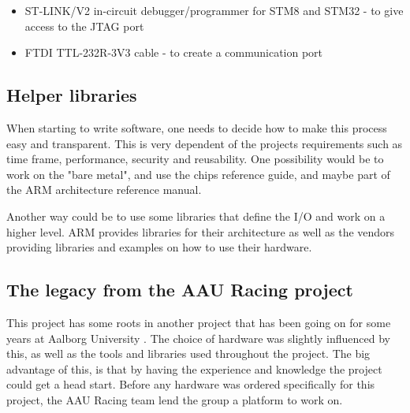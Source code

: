 \begin{itemize}[noitemsep]
	\item ST-LINK/V2 in-circuit debugger/programmer for STM8 and STM32
	\cite{st_link} - to give access to the JTAG port
	\item FTDI TTL-232R-3V3 cable \cite{ttl_usb} - to create a communication
	port
\end{itemize}

\subsection{Helper libraries}
When starting to write software, one needs to decide how to make this
process easy and transparent. This is very dependent of the
project\textquotesingle s requirements such as time frame, performance,
security and reusability. One possibility would be to work on the
"bare metal", and
use the chip\textquotesingle s reference guide\cite{reference_manual}, and maybe
part of the ARM architecture reference manual\cite{arm_architecture}.

Another way could be to use some libraries that define the I/O and work
on a higher level. ARM provides libraries for their architecture
as well as the vendors providing libraries and examples on how to use their
hardware.

\subsection{The legacy from the AAU Racing project}
This project has some roots in another project that has been going on
for some years at Aalborg University \cite{aauracing}.
The choice of hardware was
slightly influenced by this, as well as the tools and libraries used
throughout the project. The big advantage of this, is that by having the
experience and knowledge the project could get a head start.
Before any hardware was ordered specifically for this project,
the AAU Racing team lend the group a platform to work on.

